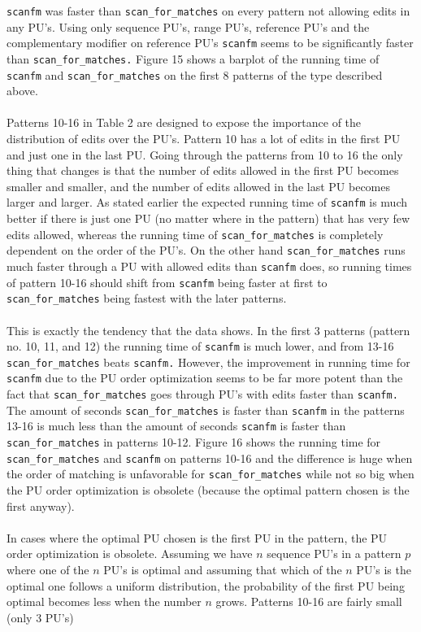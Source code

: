 \documentclass[12pt]{article}
\newcommand{\scm}{\texttt{scan\_for\_matches} }
\newcommand{\scmp}{\texttt{scan\_for\_matches.} }
\newcommand{\sfm}{\texttt{scanfm} }
\newcommand{\sfmp}{\texttt{scanfm.} }
\newcommand{\pu}{PU }
\newcommand{\pus}{PU's }
\newcommand{\pusp}{PU's. }
\newcommand{\pup}{PU. }
\begin{document}
\noindent \sfm was faster than \scm on every pattern not allowing edits in any \pusp 
Using only sequence PU's, range PU's, reference
PU's and the complementary modifier on reference \pus \sfm seems to be significantly faster than \scmp
Figure 15 shows a barplot of the running time of \sfm and \scm on the first 8 patterns of the type described above. \\ \\
Patterns 10-16 in Table 2 are designed to expose the importance of the distribution of edits over the \pusp
Pattern 10 has a lot of edits in the first \pu and just one in the last \pup Going through the patterns from 10 to 16 
the only thing that changes is that the number of edits allowed in the first \pu becomes smaller and smaller, and the
number of edits allowed in the last \pu becomes larger and larger. As stated earlier the expected running time
of \sfm is much better if there is just one \pu (no matter where in the pattern) that has very few edits allowed, whereas
the running time of \scm is completely dependent on the order of the \pusp On the other hand \scm runs much faster 
through a \pu with allowed edits than \sfm does, so running times of pattern 10-16 should shift from \sfm being faster
at first to \scm being fastest with the later patterns. \\ \\
This is exactly the tendency that the data shows. In the first 3 patterns (pattern no. 10, 11, and 12) the running time
of \sfm is much lower, and from 13-16 \scm beats \sfmp However, the improvement in running time for \sfm due to
the \pu order optimization seems to be far more potent than the fact that \scm goes through \pus with edits faster than
\sfmp The amount of seconds \scm is faster than \sfm in the patterns 13-16 is much less than the amount of seconds
\sfm is faster than \scm in patterns 10-12. Figure 16 shows the running time for \scm and \sfm on patterns 10-16
and the difference is huge when the order of matching is unfavorable for \scm while not so big when the \pu order
optimization is obsolete (because the optimal pattern chosen is the first anyway). \\ \\
In cases where the optimal \pu chosen is the first \pu in the pattern, the \pu order optimization is obsolete.
Assuming we have $n$ sequence \pus in a pattern $p$ where one of the $n$ \pus is optimal and assuming that
which of the $n$ \pus is the optimal one follows a uniform distribution, the probability
of the first \pu being optimal becomes less when the number $n$ grows. Patterns 10-16 are fairly small (only 3 PU's)
\end{document}
